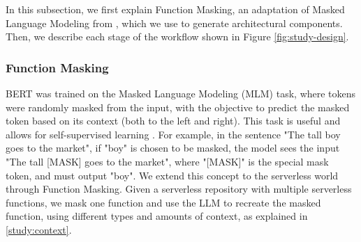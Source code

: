 In this subsection, we first explain Function Masking, an adaptation of Masked Language Modeling from \cite{kenton2019bert}, which we use to generate architectural components. Then, we describe each stage of the workflow shown in Figure \ref{fig:study-design}.
\subsubsection{Function Masking}
BERT \cite{kenton2019bert} was trained on the Masked Language Modeling (MLM) task, where tokens were randomly masked from the input, with the objective to predict the masked token based on its context (both to the left and right). This task is useful and allows for self-supervised learning \cite{liu_selfsupervised}. For example, in the sentence "The tall boy goes to the market", if "boy" is chosen to be masked, the model sees the input "The tall [MASK] goes to the market", where "[MASK]" is the special mask token, and must output "boy". We extend this concept to the serverless world through Function Masking. Given a serverless repository with multiple serverless functions, we mask one function and use the LLM to recreate the masked function, using different types and amounts of context, as explained in \ref{study:context}. 

